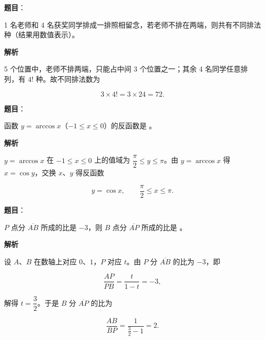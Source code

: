 \begin{answer}

\textbf{题目}：

1 名老师和 4 名获奖同学排成一排照相留念，若老师不排在两端，则共有不同排法 \gkblank{} 种（结果用数值表示）。

\textbf{解析}

5 个位置中，老师不排两端，只能占中间 3 个位置之一；其余 4 名同学任意排列，有 $4!$ 种。故不同排法数为

\nopagebreak[4]
\[
3\times 4!=3\times 24=72.
\]


\end{answer}
\begin{answer}

\textbf{题目}：

函数 $y=\arccos x$（$-1\le x\le 0$）的反函数是 \gkblank{}。

\textbf{解析}

$y=\arccos x$ 在 $-1\le x\le 0$ 上的值域为 $\dfrac{\pi}{2}\le y\le\pi$。由 $y=\arccos x$ 得 $x=\cos y$，交换 $x$、$y$ 得反函数

\nopagebreak[4]
\[
y=\cos x,\qquad \frac{\pi}{2}\le x\le\pi.
\]


\end{answer}
\begin{answer}

\textbf{题目}：

$P$ 点分 $\overline{AB}$ 所成的比是 $-3$，则 $B$ 点分 $\overline{AP}$ 所成的比是 \gkblank{}。

\textbf{解析}

设 $A$、$B$ 在数轴上对应 $0$、$1$，$P$ 对应 $t$。由 $P$ 分 $\overline{AB}$ 的比为 $-3$，即

\nopagebreak[4]
\[
\frac{AP}{PB}=\frac{t}{1-t}=-3,
\]

解得 $t=\dfrac32$。于是 $B$ 分 $\overline{AP}$ 的比为

\nopagebreak[4]
\[
\frac{AB}{BP}=\frac{1}{\frac32-1}=2.
\]


\end{answer}
